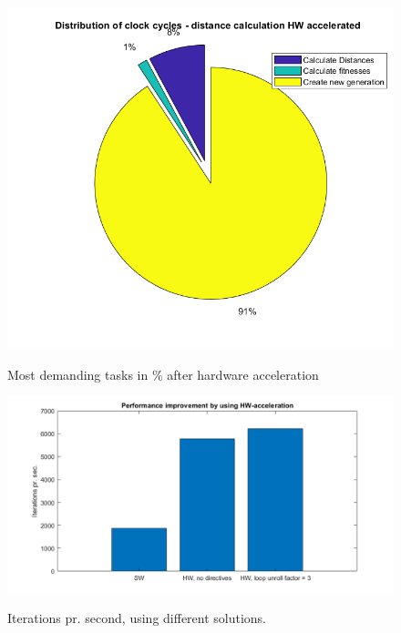 \begin{figure}[H]
	\centering
	{\includegraphics[width=\textwidth]{Images/cycle_distribution_HW_accelerated.png}}\\[0.5cm]
	\caption{Most demanding tasks in \% after hardware acceleration}
	\label{fig:timing_pie_hw}
\end{figure}

\begin{figure}[H]
	\centering
	{\includegraphics[width=\textwidth]{Images/performance_improvement_iterations_per_sec.png}}\\[0.5cm]
	\caption{Iterations pr. second, using different solutions.}
	\label{fig:iterations_per_second}
\end{figure}
